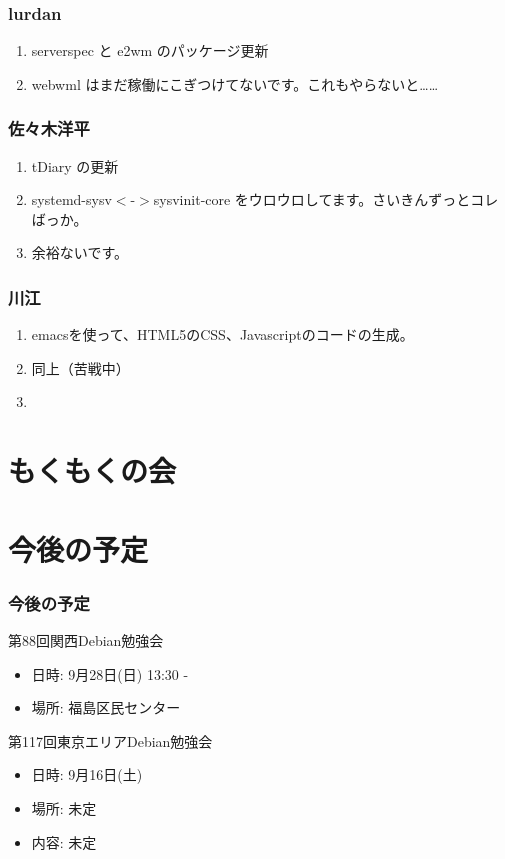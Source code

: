\documentclass[cjk,dvipdfmx,10pt,compress,%
hyperref={bookmarks=true,bookmarksnumbered=true,bookmarksopen=false,%
colorlinks=false,%
pdftitle={第 87 回 関西 Debian 勉強会},%
pdfauthor={倉敷・のがた・佐々木・かわだ・八津尾},%
pdfsubject={資料},%
}]{beamer}
\begin{document}
\begin{frame}
  \frametitle{ lurdan }
  \begin{enumerate}
  \item serverspec と e2wm のパッケージ更新
  \item webwml はまだ稼働にこぎつけてないです。これもやらないと……
  \end{enumerate}
\end{frame}

\begin{frame}
  \frametitle{ 佐々木洋平 }
  \begin{enumerate}
  \item tDiary の更新
  \item systemd-sysv$<$-$>$sysvinit-core をウロウロしてます。さいきんずっとコレばっか。
  \item 余裕ないです。
  \end{enumerate}
\end{frame}

\begin{frame}
  \frametitle{ 川江 }
  \begin{enumerate}
  \item emacsを使って、HTML5のCSS、Javascriptのコードの生成。
  \item 同上（苦戦中）
  \item
  \end{enumerate}
\end{frame}


\section{もくもくの会}


\section{今後の予定}
\begin{frame}[fragile]
\frametitle{今後の予定}

\begin{block}{第88回関西Debian勉強会}
  \begin{itemize}
  \item 日時: 9月28日(日) 13:30 -
  \item 場所: 福島区民センター
  \end{itemize}
\end{block}

\begin{block}{第117回東京エリアDebian勉強会}
  \begin{itemize}
  \item 日時: 9月16日(土)
  \item 場所: 未定
  \item 内容: 未定
  \end{itemize}
\end{block}

\end{frame}

\takahashi[50]{  }
\end{document}
